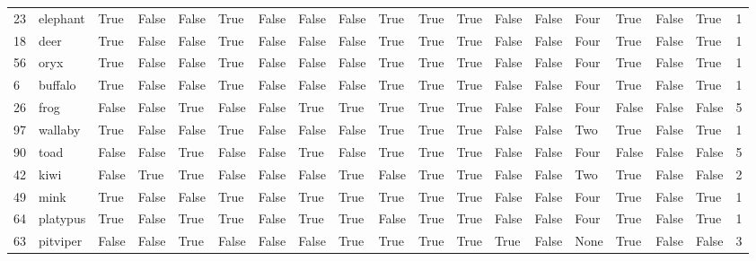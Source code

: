 \begin{tabular}{llllllllllllllllllr}
23  &    elephant &   True &     False &  False &   True &     False &    False &     False &     True &      True &      True &     False &  False &   Four &   True &     False &     True &           1 \\
18  &        deer &   True &     False &  False &   True &     False &    False &     False &     True &      True &      True &     False &  False &   Four &   True &     False &     True &           1 \\
56  &        oryx &   True &     False &  False &   True &     False &    False &     False &     True &      True &      True &     False &  False &   Four &   True &     False &     True &           1 \\
6   &     buffalo &   True &     False &  False &   True &     False &    False &     False &     True &      True &      True &     False &  False &   Four &   True &     False &     True &           1 \\
26  &        frog &  False &     False &   True &  False &     False &     True &      True &     True &      True &      True &     False &  False &   Four &  False &     False &    False &           5 \\
97  &     wallaby &   True &     False &  False &   True &     False &    False &     False &     True &      True &      True &     False &  False &    Two &   True &     False &     True &           1 \\
90  &        toad &  False &     False &   True &  False &     False &     True &     False &     True &      True &      True &     False &  False &   Four &  False &     False &    False &           5 \\
42  &        kiwi &  False &      True &   True &  False &     False &    False &      True &    False &      True &      True &     False &  False &    Two &   True &     False &    False &           2 \\
49  &        mink &   True &     False &  False &   True &     False &     True &      True &     True &      True &      True &     False &  False &   Four &   True &     False &     True &           1 \\
64  &    platypus &   True &     False &   True &   True &     False &     True &      True &    False &      True &      True &     False &  False &   Four &   True &     False &     True &           1 \\
63  &    pitviper &  False &     False &   True &  False &     False &    False &      True &     True &      True &      True &      True &  False &   None &   True &     False &    False &           3 \\

\end{tabular}
